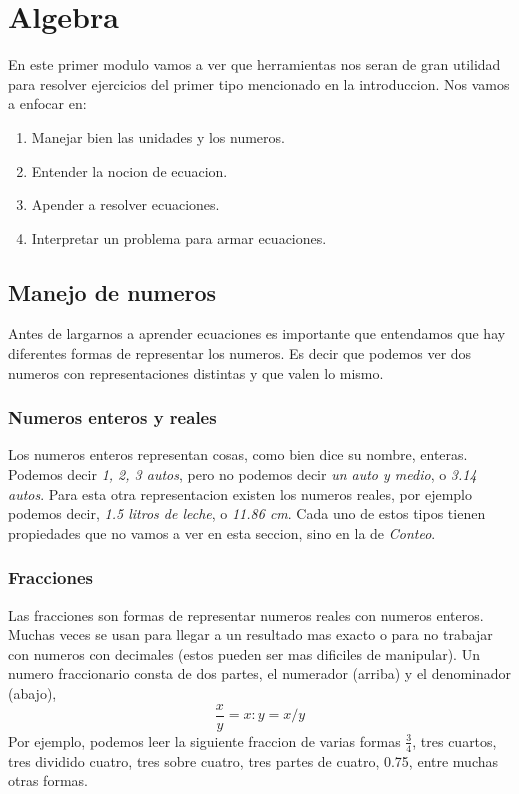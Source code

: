 \documentclass{article}
\begin{document}
\newpage

\section{Algebra}
\begin{small}
En este primer modulo vamos a ver que herramientas nos seran de gran utilidad para resolver ejercicios del primer tipo mencionado en la introduccion.
Nos vamos a enfocar en:
\begin{enumerate}
	\item Manejar bien las unidades y los numeros.
	\item Entender la nocion de ecuacion.
	\item Apender a resolver ecuaciones.
	\item Interpretar un problema para armar ecuaciones.
\end{enumerate}
\end{small}

\subsection{Manejo de numeros}
\begin{small}
Antes de largarnos a aprender ecuaciones es importante que entendamos que hay diferentes formas de representar los numeros. Es decir que podemos ver dos numeros con representaciones distintas y que valen lo mismo.
\end{small}

\subsubsection*{Numeros enteros y reales}
\begin{small}
Los numeros enteros representan cosas, como bien dice su nombre, enteras. Podemos decir \textit{1, 2, 3 autos}, pero no podemos decir \textit{un auto y medio}, o \textit{3.14 autos}. Para esta otra representacion existen los numeros reales, por ejemplo podemos decir, \textit{1.5 litros de leche}, o \textit{11.86 cm}.
Cada uno de estos tipos tienen propiedades que no vamos a ver en esta seccion, sino en la de \textit{Conteo}.
\end{small}

\subsubsection*{Fracciones}
\begin{small}
Las fracciones son formas de representar numeros reales con numeros enteros. Muchas veces se usan para llegar a un resultado mas exacto o para no trabajar con numeros con decimales (estos pueden ser mas dificiles de manipular). Un numero fraccionario consta de dos partes, el numerador (arriba) y el denominador (abajo),
\[\frac{x}{y}=x:y=x/y\]
Por ejemplo, podemos leer la siguiente fraccion de varias formas $\frac{3}{4}$, tres cuartos, tres dividido cuatro, tres sobre cuatro, tres partes de cuatro, 0.75, entre muchas otras formas.
\\
\end{small}
\end{document}
